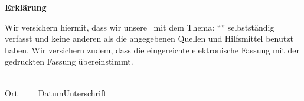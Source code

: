 

\newpage
\thispagestyle{empty}
\begin{framed}
\begin{center}
\Large\bfseries Erklärung
\end{center}
\medskip
\noindent
Wir versichern hiermit, dass wir unsere \Was\ mit
dem Thema: \enquote{\Titel} selbstständig verfasst und keine anderen als die angegebenen Quellen und
Hilfsmittel benutzt haben. Wir versichern zudem, dass die eingereichte elektronische Fassung mit der
gedruckten Fassung übereinstimmt.

\vspace{3cm}
\noindent
\underline{\hspace{4cm}}\hfill\underline{\hspace{6cm}}\\
Ort~~~~~Datum\hfill Unterschrift\hspace{4cm}
\end{framed}

\vfill

\endinput
